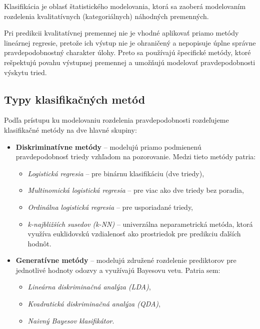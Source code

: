 Klasifikácia je oblasť štatistického modelovania, ktorá sa zaoberá modelovaním rozdelenia kvalitatívnych (kategoriálnych) náhodných premenných. 

Pri predikcii kvalitatívnej premennej nie je vhodné aplikovať priamo metódy lineárnej regresie, pretože ich výstup nie je ohraničený a nepopisuje úplne správne pravdepodobnostný charakter úlohy. Preto sa používajú špecifické metódy, ktoré rešpektujú povahu výstupnej premennej a umožňujú modelovať pravdepodobnosti výskytu tried.

\subsection*{Typy klasifikačných metód}

Podľa prístupu ku modelovaniu rozdelenia pravdepodobnosti rozdeľujeme klasifikačné metódy na dve hlavné skupiny:

\begin{itemize}
  \item \textbf{Diskriminatívne metódy} – modelujú priamo podmienenú pravdepodobnosť triedy vzhľadom na pozorovanie. Medzi tieto metódy patria:
  \begin{itemize}
    \item \textit{Logistická regresia} – pre binárnu klasifikáciu (dve triedy),
    \item \textit{Multinomická logistická regresia} – pre viac ako dve triedy bez poradia,
    \item \textit{Ordinálna logistická regresia} – pre usporiadané triedy,
    \item \textit{k-najbližších susedov (k-NN)} – univerzálna neparametrická metóda, ktorá využíva euklidovskú vzdialenosť ako prostriedok pre predikciu ďalších hodnôt.
  \end{itemize}
  
  \item \textbf{Generatívne metódy} – modelujú združené rozdelenie prediktorov pre jednotlivé hodnoty odozvy a využívajú Bayesovu vetu. Patria sem:
  \begin{itemize}
    \item \textit{Lineárna diskriminačná analýza (LDA)},
    \item \textit{Kvadratická diskriminačná analýza (QDA)},
    \item \textit{Naivný Bayesov klasifikátor}.
  \end{itemize}
\end{itemize}

